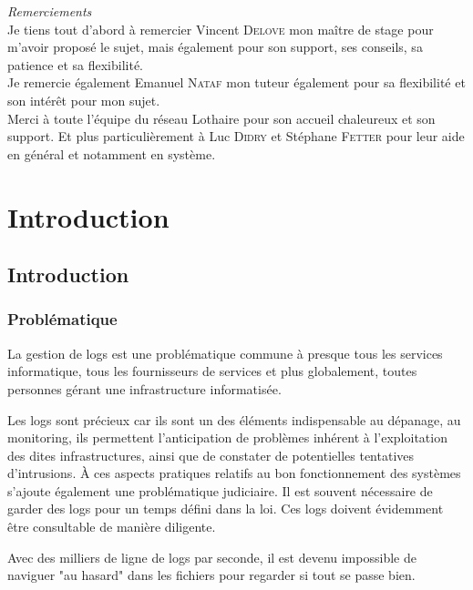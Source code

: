 \documentclass[a4paper,12pt,one side,titlepage]{report}
\begin{document}




\emph{\Large Remerciements}
\\[2cm]
Je tiens tout d'abord à remercier Vincent \textsc{Delove} mon maître de stage pour 
m'avoir proposé le sujet, mais également pour son support, ses conseils, sa patience 
et sa flexibilité.
\\[2cm]
Je remercie également Emanuel \textsc{Nataf} mon tuteur également pour sa flexibilité
et son intérêt pour mon sujet.
\\[1cm]
Merci à toute l'équipe du réseau Lothaire pour son accueil chaleureux et son support. 
Et plus particulièrement à Luc \textsc{Didry} et Stéphane \textsc{Fetter} pour leur
aide en général et notamment en système.

\setcounter{tocdepth}{1}
\tableofcontents

\part{Introduction}

\chapter{Introduction}
\section{Problématique}
La gestion de \gls{logs} est une problématique commune à presque tous les services informatique,
tous les fournisseurs de services et plus globalement, toutes personnes gérant une infrastructure 
informatisée.

Les \gls{logs} sont précieux car ils sont un des éléments indispensable au dépanage, 
au monitoring, ils permettent l'anticipation de problèmes inhérent à l'exploitation 
des dites infrastructures, ainsi que de constater de potentielles tentatives d'intrusions.
À ces aspects pratiques relatifs au bon fonctionnement des systèmes s'ajoute également
une problématique judiciaire. Il est souvent nécessaire de garder des logs pour un 
temps défini  dans la loi. Ces logs doivent évidemment être consultable de manière
diligente.

Avec des milliers de ligne de logs par seconde, il est devenu impossible de naviguer
"au hasard" dans les fichiers pour regarder si tout se passe bien.
\end{document}
